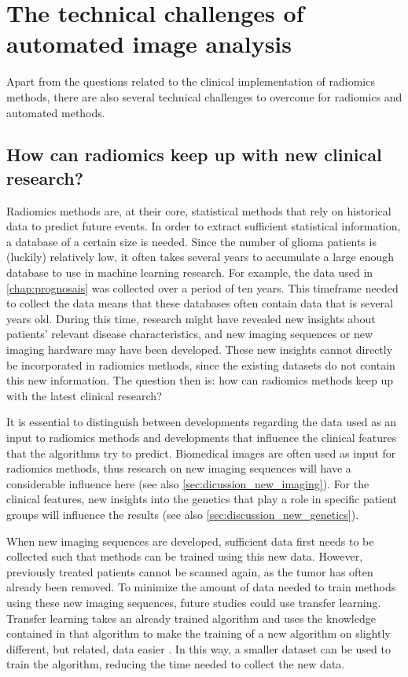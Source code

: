 \section{The technical challenges of automated image analysis}\label{sec:discussion_technical}

Apart from the questions related to the clinical implementation of radiomics methods, there are also several technical challenges to overcome for radiomics and automated methods.

\subsection{How can radiomics keep up with new clinical research?}\label{subsec:discussion_new_research}

Radiomics methods are, at their core, statistical methods that rely on historical data to predict future events.
In order to extract sufficient statistical information, a database of a certain size is needed.
Since the number of glioma patients is (luckily) relatively low, it often takes several years to accumulate a large enough database to use in machine learning research.
For example, the data used in \cref{chap:prognosais} was collected over a period of ten years.
This timeframe needed to collect the data means that these databases often contain data that is several years old.
During this time, research might have revealed new insights about patients' relevant disease characteristics, and new imaging sequences or new imaging hardware may have been developed.
These new insights cannot directly be incorporated in radiomics methods, since the existing datasets do not contain this new information.
The question then is: how can radiomics methods keep up with the latest clinical research?

It is essential to distinguish between developments regarding the data used as an input to radiomics methods and developments that influence the clinical features that the algorithms try to predict.
Biomedical images are often used as input for radiomics methods, thus research on new imaging sequences will have a considerable influence here (see also \cref{sec:dicussion_new_imaging}).
For the clinical features, new insights into the genetics that play a role in specific patient groups will influence the results (see also \cref{sec:discussion_new_genetics}).

When new imaging sequences are developed, sufficient data first needs to be collected such that methods can be trained using this new data.
However, previously treated patients cannot be scanned again, as the \gls{tumor} has often already been removed.
To minimize the amount of data needed to train methods using these new imaging sequences, future studies could use transfer learning.
Transfer learning takes an already trained algorithm and uses the knowledge contained in that algorithm to make the training of a new algorithm on slightly different, but related, data easier \autocite{shin2016transfer}.
In this way, a smaller dataset can be used to train the algorithm, reducing the time needed to collect the new data.

